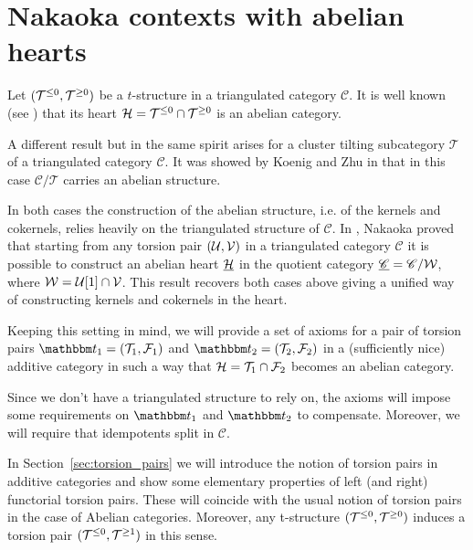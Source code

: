 \chapter{Nakaoka contexts with abelian hearts}\label{ch:nakaoka} %

Let $(\mathcal{T}^{\leq 0},\mathcal{T}^{\geq 0})$ be a $t$-structure in a triangulated category $\mathscr{C}$. It is well known (see \cite{bbd82}) that its heart $\mathcal{H}=\mathcal{T}^{\leq 0}\cap\mathcal{T}^{\geq 0}$ is an abelian category.

A different result but in the same spirit arises for a cluster tilting subcategory $\mathscr{T}$ of a triangulated category $\mathscr{C}$. It was showed by Koenig and Zhu in \cite{Koenig2008} that in this case $\mathscr{C}/\mathscr{T}$ carries an abelian structure.

In both cases the construction of the abelian structure, i.e. of the kernels and cokernels, relies heavily on the triangulated structure of $\mathscr{C}$. In \cite{Nakaokaa}, Nakaoka proved that starting from any torsion pair $(\mathcal{U},\mathcal{V})$ in a triangulated category $\mathscr{C}$ it is possible to construct an abelian heart $\underline{\mathcal{H}}$ in the quotient category $\underline{\mathscr{C}}=\mathscr{C}/\mathcal{W}$, where $\mathcal{W}=\mathcal{U}[1]\cap\mathcal{V}$.
This result recovers both cases above giving a unified way of constructing kernels and cokernels in the heart.

Keeping this setting in mind, we will provide a set of axioms for a pair of torsion pairs $\t_1=(\T_1,\F_1)$ and $\t_2=(\T_2,\F_2)$ in a (sufficiently nice) 
additive category in such a way that $\mathcal{H} = \mathcal{T}_1\cap\mathcal{F}_2$ becomes an abelian category. %

Since we don't have a triangulated structure to rely on, the axioms will impose some requirements on $\t_1$ and $\t_2$ to compensate. Moreover, we will require that idempotents split in $\mathscr{C}$.

In Section~\ref{sec:torsion_pairs} we will introduce the notion of torsion pairs in additive categories and show some elementary properties of left (and right) functorial torsion pairs. These will coincide with the usual notion of torsion pairs in the case of Abelian categories. Moreover, any t-structure $(\mathcal{T}^{\leq 0},\mathcal{T}^{\geq 0})$ induces a torsion pair $(\mathcal{T}^{\leq 0},\mathcal{T}^{\geq 1})$ in this sense.

